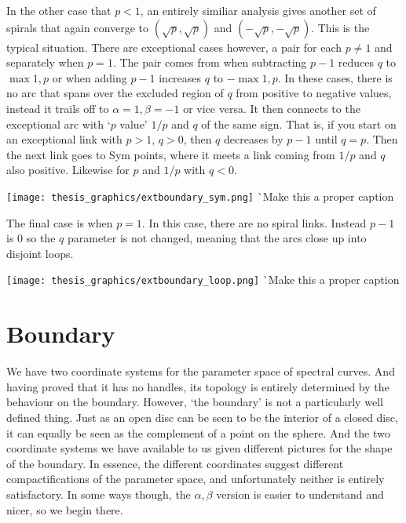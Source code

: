In the other case that $p<1$, an entirely similiar analysis gives another set of spirals that again converge to $(\sqrt{p},\sqrt{p})$ and $(-\sqrt{p},-\sqrt{p})$. This is the typical situation. There are exceptional cases however, a pair for each $p\neq 1$ and separately when $p=1$. The pair comes from when subtracting $p-1$ reduces $q$ to $\max{1,p}$ or when adding $p-1$ increases $q$ to $-\max{1,p}$. In these cases, there is no arc that spans over the excluded region of $q$ from positive to negative values, instead it trails off to $α=1,β=-1$ or vice versa. It then connects to the exceptional arc with `$p$ value' $1/p$ and $q$ of the same sign. That is, if you start on an exceptional link with $p>1$, $q>0$, then $q$ decreases by $p-1$ until $q=p$. Then the next link goes to Sym points, where it meets a link coming from $1/p$ and $q$ also positive. Likewise for $p$ and $1/p$ with $q<0$.
\begin{center}
\texttt{[image: thesis\_graphics/extboundary\_sym.png]}
^^ Make this a proper caption
\end{center}

The final case is when $p=1$. In this case, there are no spiral links. Instead $p-1$ is $0$ so the $q$ parameter is not changed, meaning that the arcs close up into disjoint loops.
\begin{center}
\texttt{[image: thesis\_graphics/extboundary\_loop.png]}
^^ Make this a proper caption
\end{center}










\section{Boundary}
\label{sec:Boundary}
We have two coordinate systems for the parameter space of spectral curves. And having proved that it has no handles, its topology is entirely determined by the behaviour on the boundary. However, `the boundary' is not a particularly well defined thing. Just as an open disc can be seen to be the interior of a closed disc, it can equally be seen as the complement of a point on the sphere. And the two coordinate systems we have available to us given different pictures for the shape of the boundary. In essence, the different coordinates suggest different compactifications of the parameter space, and unfortunately neither is entirely satisfactory. In some ways though, the $α,β$ version is easier to understand and nicer, so we begin there.


